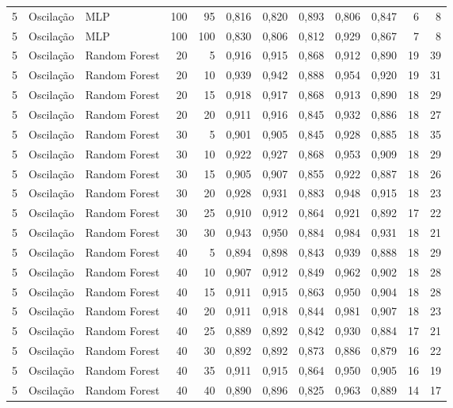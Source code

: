 \begin{longtable}{@{}rllrrrrrrrrr@{}}
5 & Oscilação & MLP & 100 & 95 & 0,816 & 0,820 & 0,893 & 0,806 & 0,847 & 6 & 8 \\
5 & Oscilação & MLP & 100 & 100 & 0,830 & 0,806 & 0,812 & 0,929 & 0,867 & 7 & 8 \\
5 & Oscilação & Random Forest & 20 & 5 & 0,916 & 0,915 & 0,868 & 0,912 & 0,890 & 19 & 39 \\
5 & Oscilação & Random Forest & 20 & 10 & 0,939 & 0,942 & 0,888 & 0,954 & 0,920 & 19 & 31 \\
5 & Oscilação & Random Forest & 20 & 15 & 0,918 & 0,917 & 0,868 & 0,913 & 0,890 & 18 & 29 \\
5 & Oscilação & Random Forest & 20 & 20 & 0,911 & 0,916 & 0,845 & 0,932 & 0,886 & 18 & 27 \\
5 & Oscilação & Random Forest & 30 & 5 & 0,901 & 0,905 & 0,845 & 0,928 & 0,885 & 18 & 35 \\
5 & Oscilação & Random Forest & 30 & 10 & 0,922 & 0,927 & 0,868 & 0,953 & 0,909 & 18 & 29 \\
5 & Oscilação & Random Forest & 30 & 15 & 0,905 & 0,907 & 0,855 & 0,922 & 0,887 & 18 & 26 \\
5 & Oscilação & Random Forest & 30 & 20 & 0,928 & 0,931 & 0,883 & 0,948 & 0,915 & 18 & 23 \\
5 & Oscilação & Random Forest & 30 & 25 & 0,910 & 0,912 & 0,864 & 0,921 & 0,892 & 17 & 22 \\
5 & Oscilação & Random Forest & 30 & 30 & 0,943 & 0,950 & 0,884 & 0,984 & 0,931 & 18 & 21 \\
5 & Oscilação & Random Forest & 40 & 5 & 0,894 & 0,898 & 0,843 & 0,939 & 0,888 & 18 & 29 \\
5 & Oscilação & Random Forest & 40 & 10 & 0,907 & 0,912 & 0,849 & 0,962 & 0,902 & 18 & 28 \\
5 & Oscilação & Random Forest & 40 & 15 & 0,911 & 0,915 & 0,863 & 0,950 & 0,904 & 18 & 28 \\
5 & Oscilação & Random Forest & 40 & 20 & 0,911 & 0,918 & 0,844 & 0,981 & 0,907 & 18 & 23 \\
5 & Oscilação & Random Forest & 40 & 25 & 0,889 & 0,892 & 0,842 & 0,930 & 0,884 & 17 & 21 \\
5 & Oscilação & Random Forest & 40 & 30 & 0,892 & 0,892 & 0,873 & 0,886 & 0,879 & 16 & 22 \\
5 & Oscilação & Random Forest & 40 & 35 & 0,911 & 0,915 & 0,864 & 0,950 & 0,905 & 16 & 19 \\
5 & Oscilação & Random Forest & 40 & 40 & 0,890 & 0,896 & 0,825 & 0,963 & 0,889 & 14 & 17 \\

\end{longtable}

